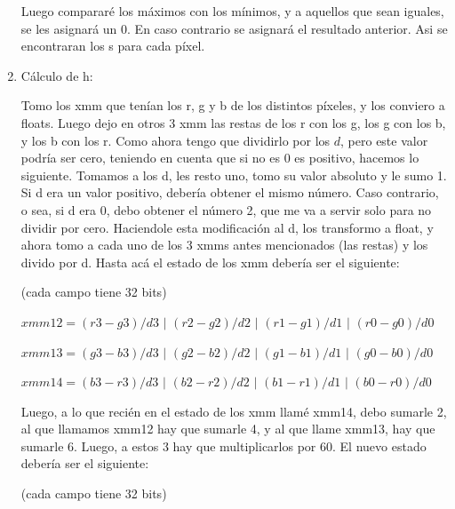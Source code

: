 \documentclass[a4paper]{article}
\begin{document}
\begin{enumerate}
\vspace*{0.3cm}
	
Luego compararé los máximos con los mínimos, y a aquellos que sean iguales, se les asignará un 0. En caso contrario se asignará el resultado anterior. Asi se encontraran los s para cada píxel.

	\item Cálculo de h:

	Tomo los xmm que tenían los r, g y b de los distintos píxeles, y los conviero a floats. Luego dejo en otros 3 xmm las restas de los r con los g, los g con los b, y los b con los r. Como ahora tengo que dividirlo por los $d$, pero este valor podría ser cero, teniendo en cuenta que si no es 0 es positivo, hacemos lo siguiente. Tomamos a los d, les resto uno, tomo su valor absoluto y le sumo 1. Si d era un valor positivo, debería obtener el mismo número. Caso contrario, o sea, si d era 0, debo obtener el número 2, que me va a servir solo para no dividir por cero. Haciendole esta modificación al d, los transformo a float, y ahora tomo a cada uno de los 3 xmms antes mencionados (las restas) y los divido por d. Hasta acá el estado de los xmm debería ser el siguiente:
	
\vspace*{0.3cm}

(cada campo tiene 32 bits)	
	
\vspace*{0.3cm}	

$xmm12=(r3-g3)/d3$ $|$ $(r2-g2)/d2$ $|$ $(r1-g1)/d1$ $|$ $(r0-g0)/d0$

\vspace*{0.3cm} 
 
$xmm13=(g3-b3)/d3$ $|$ $(g2-b2)/d2$ $|$ $(g1-b1)/d1$ $|$ $(g0-b0)/d0$

\vspace*{0.3cm}

$xmm14=(b3-r3)/d3$ $|$ $(b2-r2)/d2$ $|$ $(b1-r1)/d1$ $|$ $(b0-r0)/d0$	
	
\vspace*{0.3cm}
	
	Luego, a lo que recién en el estado de los xmm llamé xmm14, debo sumarle 2, al que llamamos xmm12 hay que sumarle 4, y al que llame xmm13, hay que sumarle 6. Luego, a estos 3 hay que multiplicarlos por 60. El nuevo estado debería ser el siguiente:
	
\vspace*{0.3cm}

(cada campo tiene 32 bits)	
	

\end{enumerate}
\end{document}
